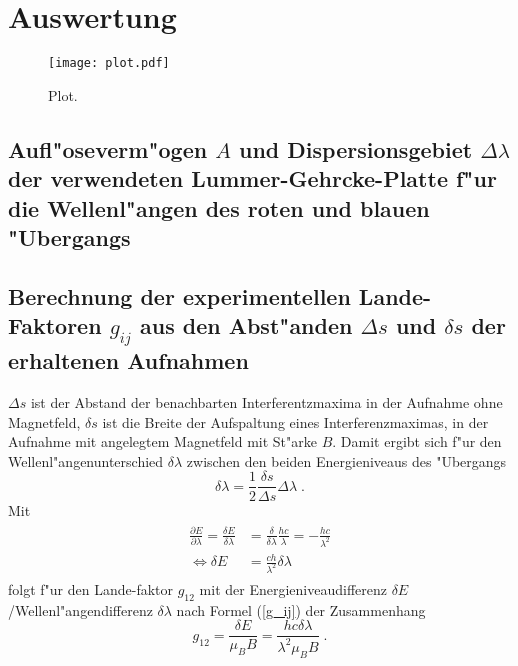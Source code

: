 \section{Auswertung}
\label{sec:Auswertung}

\begin{figure}
  \centering
  \texttt{[image: plot.pdf]}
  \caption{Plot.}
  \label{fig:plot}
\end{figure}


  \subsection{\texorpdfstring{Aufl"oseverm"ogen $A$ und Dispersionsgebiet $\Delta \lambda$ der verwendeten Lummer-Gehrcke-Platte f"ur die Wellenl"angen des roten und blauen "Ubergangs}{Aufl"oseverm"ogen A und Dispersionsgebiet Delta lambda der verwendeten Lummer-Gehrcke-Platte f"ur die Wellenl"angen des roten und blauen "Ubergangs}}

  \subsection{\texorpdfstring{Berechnung der experimentellen Lande-Faktoren $g_{ij}$ aus den Abst"anden $\Delta s$ und $\delta s$ der erhaltenen Aufnahmen}{Berechnung der experimentellen Lande-Faktoren g_{ij} aus den Abst"anden Delta s und delta s der erhaltenen Aufnahmen}}

  $\Delta s$ ist der Abstand der benachbarten Interferentzmaxima in der Aufnahme ohne Magnetfeld, $\delta s$ ist die Breite der Aufspaltung eines Interferenzmaximas, in der Aufnahme mit angelegtem Magnetfeld mit St"arke $B$.
  Damit ergibt sich f"ur den Wellenl"angenunterschied $\delta \lambda$ zwischen den beiden Energieniveaus des "Ubergangs
  \begin{equation}
    \delta \lambda = \frac{1}{2}\frac{\delta s}{\Delta s} \Delta \lambda \; .
  \end{equation}
  Mit
  \begin{align}
    \begin{split}
    \frac{\partial E}{\partial \lambda} = \frac{\delta E}{\delta \lambda} &= \frac{\delta}{\delta \lambda} \frac{hc}{\lambda} = -\frac{hc}{\lambda^2}\\
    \iff \delta E &= \frac{ch}{\lambda^2} \delta \lambda
   \end{split}
  \end{align}
  folgt f"ur den Lande-faktor $g_{12}$ mit der Energieniveaudifferenz $\delta E$/Wellenl"angendifferenz $\delta \lambda$ nach Formel (\ref{g_ij}) der Zusammenhang
  \begin{equation}
    g_{12}=\frac{\delta E}{\mu_BB}=\frac{hc\delta \lambda}{\lambda^2\mu_BB} \; .
  \end{equation}


